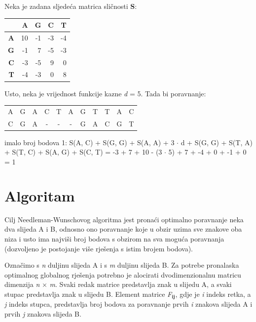 \documentclass[times, utf8, zavrsni]{fer}
\begin{document}
Neka je zadana sljedeća matrica sličnosti \textbf{S}:
\begin{center}
\begin{tabular}{r | r r r r}
 & \textbf{A} & \textbf{G} & \textbf{C} & \textbf{T} \\
\hline
\textbf{A} & 10 & -1 & -3 & -4\\
\textbf{G} & -1 & 7 & -5 & -3\\
\textbf{C} & -3 & -5 & 9 & 0\\
\textbf{T} & -4 & -3 & 0 & 8\\
\end{tabular}
\end{center}
Usto, neka je vrijednost funkcije kazne \textit{d} = 5. Tada bi poravnanje:
\begin{center}
\begin{tabular}{c c c c c c c c c c c }
A & G & A & C & T & A & G & T & T & A & C \\
C & G & A & - & - & - & G & A & C & G & T \\
\end{tabular}
\end{center}
imalo broj bodova 1: S(A, C) + S(G, G) + S(A, A) + 3 $\cdot$ d + S(G, G) + S(T, A) + S(T, C) + S(A, G) + S(C, T) = -3 + 7 + 10 - (3 $\cdot$ 5) + 7 + -4 + 0 + -1 + 0 = 1

\section{Algoritam}

\indent

Cilj Needleman-Wunschovog algoritma jest pronaći optimalno poravnanje neka dva slijeda A i B, odnosno ono poravnanje koje u obzir uzima sve znakove oba niza i usto ima najviši broj bodova s obzirom na sva moguća poravnanja (dozvoljeno je postojanje više rješenja s istim brojem bodova).

Označimo s \textit{n} duljinu slijeda A i s \textit{m} duljinu slijeda B. Za potrebe pronalaska optimalnog globalnog rješenja potrebno je alocirati dvodimenzionalnu matricu dimenzija \textit{n} $\times$ \textit{m}. Svaki redak matrice predstavlja znak u slijedu A, a svaki stupac predstavlja znak u slijedu B. Element matrice \textit{F$_{\textbf{ij}}$}, gdje je \textit{i} indeks retka, a \textit{j} indeks stupca, predstavlja broj bodova za poravnanje prvih \textit{i} znakova slijeda A i prvih \textit{j} znakova slijeda B.
\end{document}
